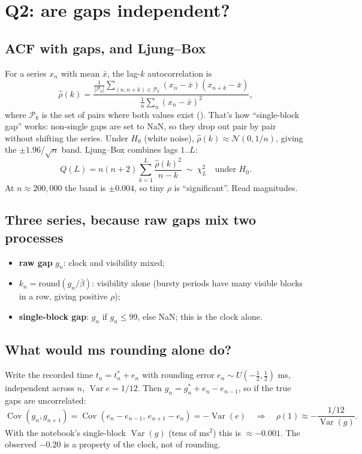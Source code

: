 \documentclass[11pt,a4paper]{article}
\newcommand{\code}[1]{\texttt{\detokenize{#1}}}
\newcommand{\Var}{\operatorname{Var}}
\newcommand{\Cov}{\operatorname{Cov}}
\begin{document}
\section{Q2: are gaps independent?}

\subsection{ACF with gaps, and Ljung--Box}
For a series $x_n$ with mean $\bar x$, the lag-$k$ autocorrelation is
\begin{equation}
  \hat\rho(k)=\frac{\frac1{|\mathcal P_k|}\sum_{(n,n+k)\in\mathcal P_k}(x_n-\bar x)(x_{n+k}-\bar x)}{\frac1{n}\sum_n(x_n-\bar x)^2},
\end{equation}
where $\mathcal P_k$ is the set of pairs where both values exist (\code{acf_nan}). That's how ``single-block gap'' works: non-single gaps are set to NaN, so they
drop out pair by pair without shifting the series. Under $H_0$ (white noise), $\hat\rho(k)\approx\mathcal N(0,1/n)$, giving the $\pm1.96/\sqrt n$ band. Ljung--Box combines lags $1..L$:
\begin{equation}
  Q(L)=n(n+2)\sum_{k=1}^{L}\frac{\hat\rho(k)^2}{n-k}\ \sim\ \chi^2_L\quad\text{under }H_0.
\end{equation}
At $n\approx200{,}000$ the band is $\pm0.004$, so tiny $\rho$ is ``significant''. Read magnitudes.

\subsection{Three series, because raw gaps mix two processes}
\begin{itemize}
  \item \textbf{raw gap} $g_n$: clock and visibility mixed;
  \item \textbf{$k_n=\mathrm{round}(g_n/\bar\beta)$}: visibility alone (bursty periods have many visible blocks in a row, giving positive $\rho$);
  \item \textbf{single-block gap}: $g_n$ if $g_n\le99$, else NaN; this is the clock alone.
\end{itemize}

\subsection{What would ms rounding alone do?}
Write the recorded time $t_n=t_n^\ast+e_n$ with rounding error $e_n\sim U(-\tfrac12,\tfrac12)$ ms, independent across $n$, $\Var e=1/12$. Then
$g_n=g_n^\ast+e_n-e_{n-1}$, so if the true gaps are uncorrelated:
\begin{equation}
  \Cov(g_n,g_{n+1}) = \Cov(e_n-e_{n-1},\,e_{n+1}-e_n) = -\Var(e) \quad\Longrightarrow\quad
  \rho(1)\approx-\frac{1/12}{\Var(g)}.
\end{equation}
With the notebook's single-block $\Var(g)$ (tens of ms$^2$) this is $\approx-0.001$. The observed $-0.20$ is a property of the clock, not of rounding.
\end{document}
